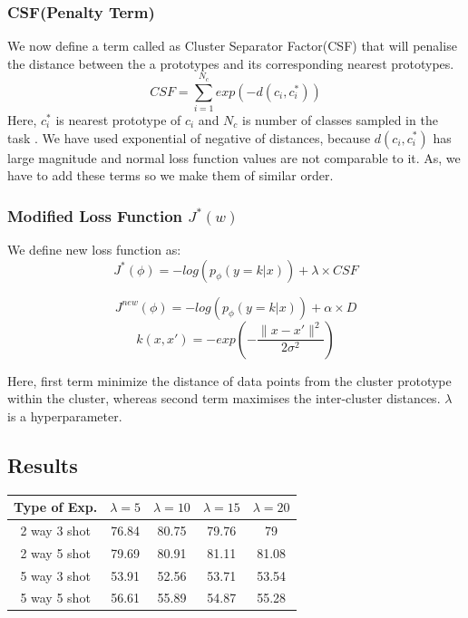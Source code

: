\subsubsection{CSF(Penalty Term)}
We now define a term called as Cluster Separator Factor(CSF) that will penalise the distance between the a prototypes and its corresponding nearest prototypes.
\[
	{CSF = \sum_{i=1}^{N_c} exp(-d(c_i,c_i^*))}
\]
Here, \(c_i^*\) is nearest prototype of \(c_i\) and \(N_c\) is number of classes sampled in the task . We have used exponential of negative of distances, because \(d(c_i,c_i^*)\) has large magnitude and normal loss function values are not comparable to it. As, we have to add these terms so we make them of similar order.

\subsubsection{Modified Loss Function \(J^*(w)\)}
We define new loss function as:
\[
	{J^*(\phi)= -log(p_\phi (y=k|x)) + \lambda\times CSF}
\]

\[
	{J^{new}(\phi)= -log(p_\phi (y=k|x)) + \alpha\times D}
\]
\[
	{k(x, x')= -exp(-\frac{\|x - x'\|^2}{2\sigma^2})}
\]



Here, first term minimize the distance of data points from the cluster prototype within the cluster, whereas second term maximises the inter-cluster distances. \(\lambda\) is a hyperparameter. 
\subsection{Results}

\begin{center}
\begin{tabular}{|c |c |c |c|c|}
\hline
Type of Exp. & \(\lambda=5\) & \(\lambda=10\) & \(\lambda=15\) & \(\lambda=20\) \\
\hline\hline
2 way 3 shot & 76.84 & 80.75 & 79.76 & 79 \\
2 way 5 shot & 79.69 & 80.91 & 81.11 & 81.08 \\
5 way 3 shot & 53.91 & 52.56 & 53.71 & 53.54  \\
5 way 5 shot & 56.61 & 55.89 & 54.87 &  55.28 \\
\hline
\end{tabular}
\end{center}

